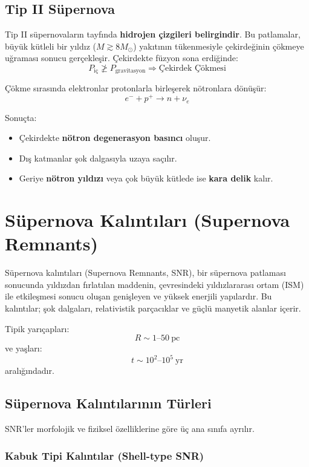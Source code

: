 \subsection{Tip II Süpernova}
Tip II süpernovaların tayfında \textbf{hidrojen çizgileri belirgindir}. Bu patlamalar, büyük kütleli bir yıldız ($M \gtrsim 8M_{\odot}$) yakıtının tükenmesiyle çekirdeğinin çökmeye uğraması sonucu gerçekleşir. Çekirdekte füzyon sona erdiğinde:
\[
P_{\text{iç}} \not\geq P_{\text{gravitasyon}} \Rightarrow \text{Çekirdek Çökmesi}
\]

Çökme sırasında elektronlar protonlarla birleşerek nötronlara dönüşür:
\[
e^- + p^+ \rightarrow n + \nu_e
\]

Sonuçta:
\begin{itemize}
    \item Çekirdekte \textbf{nötron degenerasyon basıncı} oluşur.
    \item Dış katmanlar şok dalgasıyla uzaya saçılır.
    \item Geriye \textbf{nötron yıldızı} veya çok büyük kütlede ise \textbf{kara delik} kalır.
\end{itemize}

\section{Süpernova Kalıntıları (Supernova Remnants)}

Süpernova kalıntıları (Supernova Remnants, SNR), bir süpernova patlaması sonucunda yıldızdan fırlatılan maddenin, çevresindeki yıldızlararası ortam (ISM) ile etkileşmesi sonucu oluşan genişleyen ve yüksek enerjili yapılardır. Bu kalıntılar; şok dalgaları, relativistik parçacıklar ve güçlü manyetik alanlar içerir.

Tipik yarıçapları:
\begin{equation}
R \sim 1\text{--}50\ \mathrm{pc}
\end{equation}
ve yaşları:
\begin{equation}
t \sim 10^2\text{--}10^5\ \mathrm{yr}
\end{equation}
aralığındadır.

\subsection{Süpernova Kalıntılarının Türleri}

SNR'ler morfolojik ve fiziksel özelliklerine göre üç ana sınıfa ayrılır.

\subsubsection{Kabuk Tipi Kalıntılar (Shell-type SNR)}

